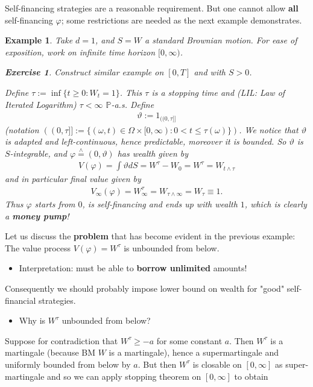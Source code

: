 \documentclass[12pt,a4paper, twoside]{article}
\newtheorem{exe}{Exercise}[section]
\newtheorem{exmp}{Example}[section]
\theoremstyle{definition}
\newcommand{\PP}{\mathbb{P}} %
\newcommand{\teq}{\overset{\wedge}{=}}
\begin{document}
Self-financing strategies are a reasonable requirement. But one cannot allow \textbf{all} self-financing $\varphi$; some restrictions are needed as the next example demonstrates. 
\begin{exmp} Take $d=1$, and $S=W$ a standard Brownian motion. For ease of exposition, work on infinite time horizon $[0, \infty)$.
\begin{exe} \label{ex1} Construct similar example on $[0,T]$ and with $S>0$. 
\end{exe}
Define $\tau:= \inf \{ t \geq 0 : W_t=1 \}$. This $\tau$ is a stopping time and (LIL: Law of Iterated Logarithm) $\tau < \infty$ $\PP$-a.s. Define 
\begin{align*}
\vartheta:= 1_{(\!(0, \tau]\!]}
\end{align*}
(notation $(\!(0, \tau ]\!] := \{ ( \omega, t) \in \Omega \times [0, \infty) : 0 < t \leq \tau (\omega) \})$. We notice that $\vartheta$ is adapted and left-continuous, hence predictable, moreover it is bounded. So $\vartheta$ is $S$-integrable, and $\varphi \teq (0, \vartheta)$ has wealth given by 
\begin{align*}
V(\varphi)= \int \vartheta dS = W^\tau - W_0 = W^\tau=W_{t \wedge \tau}
\end{align*}
and in particular final value given by 
\begin{align*}
V_\infty( \varphi)= W_\infty^\tau = W_{\tau \wedge \infty} = W_\tau \equiv 1.
\end{align*}
Thus $\varphi$ starts from $0$, is self-financing and ends up with wealth $1$, which is clearly a \textbf{money pump}!
\end{exmp}
\newpage
Let us discuss the \textbf{problem} that has become evident in the previous example: The value process $V( \varphi) = W^\tau$ is unbounded from below.
\begin{itemize}
\item Interpretation: must be able to \textbf{borrow unlimited} amounts!
\end{itemize}
Consequently we should probably impose lower bound on wealth for "good" self-financial strategies. 
\begin{itemize}
\item Why is $W^\tau$ unbounded from below?
\end{itemize}
Suppose for contradiction that $W^\tau \geq -a$ for some constant $a$. Then $W^\tau$ is a martingale (because BM $W$ is a martingale), hence a supermartingale and uniformly bounded from below by $a$. But then $W^\tau$ is closable on $[0, \infty]$ as super-martingale and so we can apply stopping theorem on $[0, \infty]$ to obtain 
\end{document}
